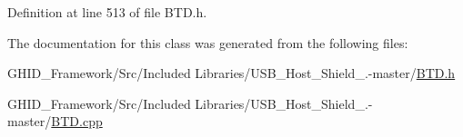 \-Definition at line 513 of file \-B\-T\-D.\-h.



\-The documentation for this class was generated from the following files\-:\begin{DoxyCompactItemize}
\item 
\-G\-H\-I\-D\-\_\-\-Framework/\-Src/\-Included Libraries/\-U\-S\-B\-\_\-\-Host\-\_\-\-Shield\-\_.-\/master/\hyperlink{_b_t_d_8h}{\-B\-T\-D.\-h}\item 
\-G\-H\-I\-D\-\_\-\-Framework/\-Src/\-Included Libraries/\-U\-S\-B\-\_\-\-Host\-\_\-\-Shield\-\_.-\/master/\hyperlink{_b_t_d_8cpp}{\-B\-T\-D.\-cpp}\end{DoxyCompactItemize}
